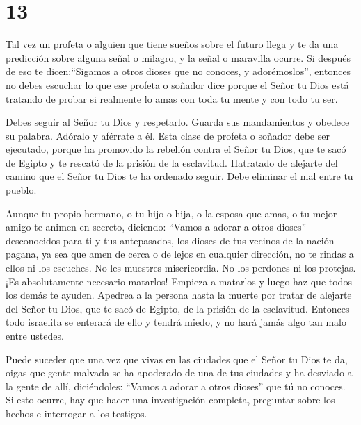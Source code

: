 \hypertarget{section-12}{%
\section{13}\label{section-12}}

 Tal vez un profeta o alguien que tiene sueños sobre el
futuro llega y te da una predicción sobre alguna señal o milagro,
 y la señal o maravilla ocurre. Si después de eso te
dicen:``Sigamos a otros dioses que no conoces, y adorémoslos'',
 entonces no debes escuchar lo que ese profeta o soñador
dice porque el Señor tu Dios está tratando de probar si realmente lo
amas con toda tu mente y con todo tu ser.

 Debes seguir al Señor tu Dios y respetarlo. Guarda sus
mandamientos y obedece su palabra. Adóralo y aférrate a él. 
Esta clase de profeta o soñador debe ser ejecutado, porque ha promovido
la rebelión contra el Señor tu Dios, que te sacó de Egipto y te rescató
de la prisión de la esclavitud. Hatratado de alejarte del camino que el
Señor tu Dios te ha ordenado seguir. Debe eliminar el mal entre tu
pueblo.

 Aunque tu propio hermano, o tu hijo o hija, o la esposa que
amas, o tu mejor amigo te animen en secreto, diciendo: ``Vamos a adorar
a otros dioses'' desconocidos para ti y tus antepasados, 
los dioses de tus vecinos de la nación pagana, ya sea que amen de cerca
o de lejos en cualquier dirección,  no te rindas a ellos ni
los escuches. No les muestres misericordia. No los perdones ni los
protejas.  ¡Es absolutamente necesario matarlos! Empieza a
matarlos y luego haz que todos los demás te ayuden. 
Apedrea a la persona hasta la muerte por tratar de alejarte del Señor tu
Dios, que te sacó de Egipto, de la prisión de la esclavitud.
 Entonces todo israelita se enterará de ello y tendrá
miedo, y no hará jamás algo tan malo entre ustedes.

 Puede suceder que una vez que vivas en las ciudades que el
Señor tu Dios te da, oigas  que gente malvada se ha
apoderado de una de tus ciudades y ha desviado a la gente de allí,
diciéndoles: ``Vamos a adorar a otros dioses'' que tú no conoces.
 Si esto ocurre, hay que hacer una investigación completa,
preguntar sobre los hechos e interrogar a los testigos.

